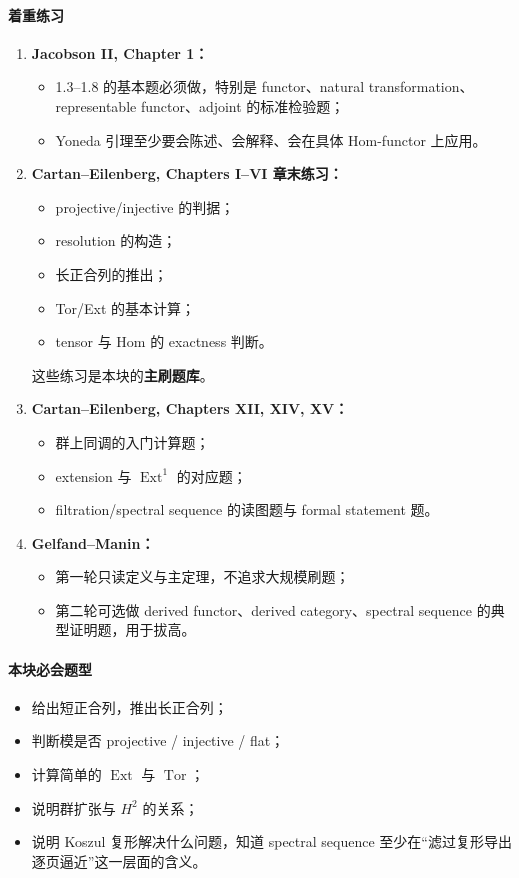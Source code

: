 \documentclass[12pt,a4paper]{ctexart}
\begin{document}
\paragraph{着重练习}
\begin{enumerate}
  \item \textbf{Jacobson II, Chapter 1：}
  \begin{itemize}
    \item 1.3--1.8 的基本题必须做，特别是 functor、natural transformation、representable functor、adjoint 的标准检验题；
    \item Yoneda 引理至少要会陈述、会解释、会在具体 Hom-functor 上应用。
  \end{itemize}

  \item \textbf{Cartan--Eilenberg, Chapters I--VI 章末练习：}
  \begin{itemize}
    \item projective/injective 的判据；
    \item resolution 的构造；
    \item 长正合列的推出；
    \item Tor/Ext 的基本计算；
    \item tensor 与 Hom 的 exactness 判断。
  \end{itemize}
  这些练习是本块的\textbf{主刷题库}。

  \item \textbf{Cartan--Eilenberg, Chapters XII, XIV, XV：}
  \begin{itemize}
    \item 群上同调的入门计算题；
    \item extension 与 \( \operatorname{Ext}^1 \) 的对应题；
    \item filtration/spectral sequence 的读图题与 formal statement 题。
  \end{itemize}

  \item \textbf{Gelfand--Manin：}
  \begin{itemize}
    \item 第一轮只读定义与主定理，不追求大规模刷题；
    \item 第二轮可选做 derived functor、derived category、spectral sequence 的典型证明题，用于拔高。
  \end{itemize}
\end{enumerate}

\paragraph{本块必会题型}
\begin{itemize}
  \item 给出短正合列，推出长正合列；
  \item 判断模是否 projective / injective / flat；
  \item 计算简单的 \( \operatorname{Ext} \) 与 \( \operatorname{Tor} \)；
  \item 说明群扩张与 \(H^2\) 的关系；
  \item 说明 Koszul 复形解决什么问题，知道 spectral sequence 至少在“滤过复形导出逐页逼近”这一层面的含义。
\end{itemize}
\end{document}
